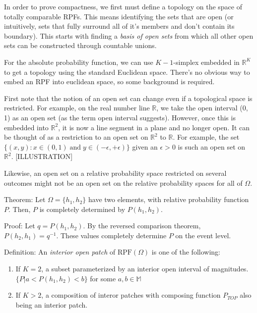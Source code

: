 \documentclass[twoside]{article}
\begin{document}
In order to prove compactness, we first must define a topology on the space of totally comparable RPFs. This means identifying the sets that are open (or intuitively, sets that fully surround all of it's members and don't contain its boundary). This starts with finding a \textit{basis of open sets} from which all other open sets can be constructed through countable unions.

For the absolute probability function, we can use \(K-1\)-simplex embedded in \(\mathbb{R}^K\) to get a topology using the standard Euclidean space. There's no obvious way to embed an RPF into euclidean space, so some background is required.

First note that the notion of an open set can change even if a topological space is restricted. For example, on the real number line \(\mathbb{R}\), we take the open interval (0, 1) as an open set (as the term open interval suggests). However, once this is embedded into \(\mathbb{R}^2\), it is now a line segment in a plane and no longer open. It can be thought of as a restriction to an open set on \(\mathbb{R}^2\) to \(\mathbb{R}\). For example, the set \(\{(x, y): x \in (0, 1)\;  \text{and}\;  y \in (-\epsilon, +\epsilon)\}\) given an \(\epsilon > 0\) is such an open set on \(\mathbb{R}^2\). [ILLUSTRATION]

Likewise, an open set on a relative probability space restricted on several outcomes might not be an open set on the relative probability spaces for all of \(\Omega\).

Theorem: Let \(\Omega = \{h_1, h_2\}\) have two elements, with relative probability function \(P\). Then, \(P\) is completely determined by \(P(h_1, h_2)\).

Proof: Let \(q = P(h_1, h_2)\). By the reversed comparison theorem, \(P(h_2, h_1) = q^{-1}\). These values completely determine \(P\) on the event level.

Definition: An \textit{interior open patch} of \(\text{RPF}(\Omega)\) is one of the following:

\begin{enumerate}
  \item If \(K = 2\), a subset parameterized by an interior open interval of magnitudes. \(\{P | a < P(h_1, h_2) < b\}\) for some \(a, b \in \mathbb{M}\) 
  \item If \(K > 2\), a composition of interor patches with composing function \(P_{TOP}\) also being an interior patch.
\end{enumerate}
\end{document}
